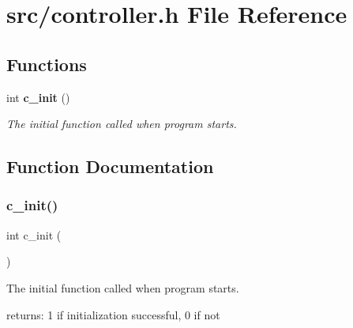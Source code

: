 \section{src/controller.h File Reference}
\label{controller_8h}
\subsection*{Functions}
\begin{DoxyCompactItemize}
\item 
int \textbf{ c\+\_\+init} ()
\begin{DoxyCompactList}\small\item\em The initial function called when program starts. \end{DoxyCompactList}\end{DoxyCompactItemize}


\subsection{Function Documentation}
\mbox{\label{controller_8h_a05510c73d1644e21429ac9ed43fb91be}} 
\subsubsection{c\+\_\+init()}
{\footnotesize\ttfamily int c\+\_\+init (\begin{DoxyParamCaption}{ }\end{DoxyParamCaption})}



The initial function called when program starts. 

returns\+: 1 if initialization successful, 0 if not 